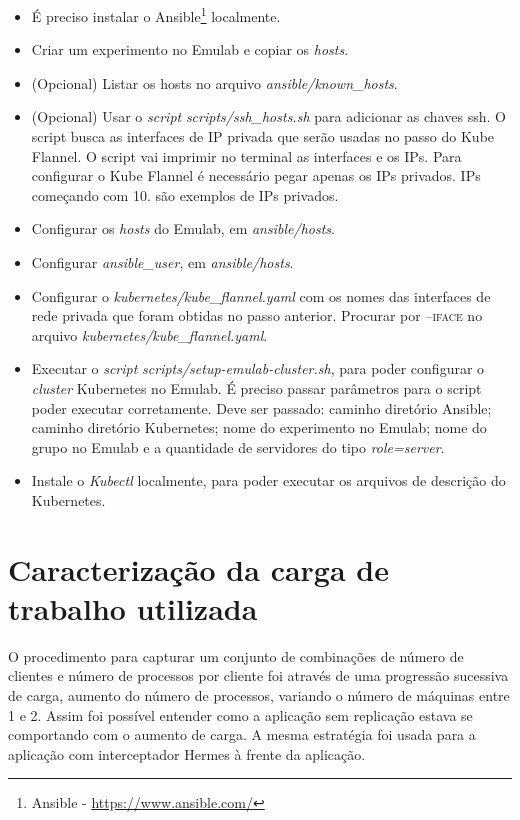 \begin{itemize}
\item É preciso instalar o Ansible\footnote{Ansible - \url{https://www.ansible.com/}} localmente.
\item Criar um experimento no Emulab e copiar os \textit{hosts}.
\item (Opcional) Listar os hosts no arquivo \textit{ansible/known\_hosts}.
\item (Opcional) Usar o \textit{script} \textit{scripts/ssh\_hosts.sh} para adicionar as chaves ssh. O script busca as interfaces de IP privada que serão usadas no passo do Kube Flannel. O script vai imprimir no terminal as interfaces e os IPs. Para configurar o Kube Flannel é necessário pegar apenas os IPs privados. IPs começando com \textsc{10.} são exemplos de IPs privados.
\item Configurar os \textit{hosts} do Emulab, em \textit{ansible/hosts}.
\item Configurar \textit{ansible\_user}, em \textit{ansible/hosts}.
\item Configurar o \textit{kubernetes/kube\_flannel.yaml} com os nomes das interfaces de rede privada que foram obtidas no passo anterior. Procurar por \textsc{--iface} no arquivo \textit{kubernetes/kube\_flannel.yaml}.
\item Executar o \textit{script} \textit{scripts/setup-emulab-cluster.sh}, para poder configurar o \textit{cluster} Kubernetes no Emulab. É preciso passar parâmetros para o script poder executar corretamente. Deve ser passado: caminho diretório Ansible; caminho diretório Kubernetes; nome do experimento no Emulab; nome do grupo no Emulab e a quantidade de servidores do tipo \textit{role=server}.
\item Instale o \textit{Kubectl} localmente, para poder executar os arquivos de descrição do Kubernetes.
\end{itemize}

\section{Caracterização da carga de trabalho utilizada}

O procedimento para capturar um conjunto de combinações de número de clientes e número de processos por cliente foi através de uma progressão sucessiva de carga, aumento do número de processos, variando o número de máquinas entre 1 e 2. Assim foi possível entender como a aplicação sem replicação estava se comportando com o aumento de carga. A mesma estratégia foi usada para a aplicação com interceptador Hermes à frente da aplicação.


